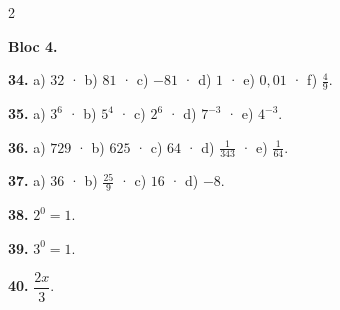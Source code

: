 \documentclass[13pt,a4paper]{extarticle}
\begin{document}
\begin{multicols}{2}
\begin{minipage}{\linewidth}
\textbf{Bloc 4.}\par
\end{minipage}\par\vspace{1.6mm}
\par\noindent\begin{minipage}{\linewidth}
\textbf{34.} a) $32$ · b) $81$ · c) $-81$ · d) $1$ · e) $0{,}01$ · f) $\tfrac49$.\par
\end{minipage}\par\vspace{1.6mm}
\par\noindent\begin{minipage}{\linewidth}
\textbf{35.} a) $3^6$ · b) $5^4$ · c) $2^6$ · d) $7^{-3}$ · e) $4^{-3}$.\par
\end{minipage}\par\vspace{1.6mm}
\par\noindent\begin{minipage}{\linewidth}
\textbf{36.} a) $729$ · b) $625$ · c) $64$ · d) $\tfrac1{343}$ · e) $\tfrac1{64}$.\par
\end{minipage}\par\vspace{1.6mm}
\par\noindent\begin{minipage}{\linewidth}
\textbf{37.} a) $36$ · b) $\tfrac{25}{9}$ · c) $16$ · d) $-8$.\par
\end{minipage}\par\vspace{1.6mm}
\par\noindent\begin{minipage}{\linewidth}
\textbf{38.} $2^0=1$.\par
\end{minipage}\par\vspace{1.6mm}
\par\noindent\begin{minipage}{\linewidth}
\textbf{39.} $3^0=1$.\par
\end{minipage}\par\vspace{1.6mm}
\par\noindent\begin{minipage}{\linewidth}
\textbf{40.} $\dfrac{2x}{3}$.\par

\end{minipage}
\end{multicols}
\end{document}

